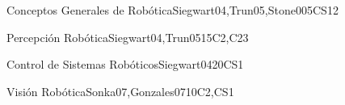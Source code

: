 \begin{syllabus}
\begin{unit}{\ISRobotics}{Conceptos Generales de Robótica}{Siegwart04,Trun05,Stone00}{5}{CS12}
\begin{topics}%
	\item \ISRoboticsTopicOverview
	\item \ISRoboticsTopicConfiguration
\end{topics}
\begin{learningoutcomes}
  
	\item \ISRoboticsLOListCapabilities [\Familiarity]
	\item \ISRoboticsLOIntegrate [\Usage]
\end{learningoutcomes}
\end{unit}

\begin{unit}{\ISRobotics}{Percepción Robótica}{Siegwart04,Trun05}{15}{C2,C23}
\begin{topics}%
	\item \ISRoboticsTopicInterpreting
	\item \ISRoboticsTopicLocalizing
\end{topics}
\begin{learningoutcomes}
	\item \ISRoboticsLOProgram [\Usage]
	\item \ISRoboticsLOImplementFundamental [\Usage]
\end{learningoutcomes}
\end{unit}

\begin{unit}{\ISRobotics}{Control de Sistemas Robóticos}{Siegwart04}{20}{CS1}
\begin{topics}%
	\item \ISRoboticsTopicNavigation
	\item \ISRoboticsTopicMotion
\end{topics}
\begin{learningoutcomes}
	\item \ISRoboticsLOCharacterizeTheWith [\Usage]
	\item \ISRoboticsLOListTheRobots [\Usage]
\end{learningoutcomes}
\end{unit}

\begin{unit}{\ISPerceptionandComputerVision}{Visión Robótica}{Sonka07,Gonzales07}{10}{C2,CS1}
\begin{topics}%
    \item \ISPerceptionandComputerVisionTopicComputer
    \item \ISPerceptionandComputerVisionTopicModularity
\end{topics}
\begin{learningoutcomes}
    \item \ISPerceptionandComputerVisionLOSummarizeTheImage [\Usage]
    \item \ISPerceptionandComputerVisionLOImplementD [\Usage]
\end{learningoutcomes}
\end{unit}


\end{syllabus}

